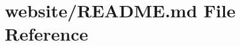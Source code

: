 \hypertarget{website_2README_8md}{}\section{website/\+R\+E\+A\+D\+ME.md File Reference}
\label{website_2README_8md}
